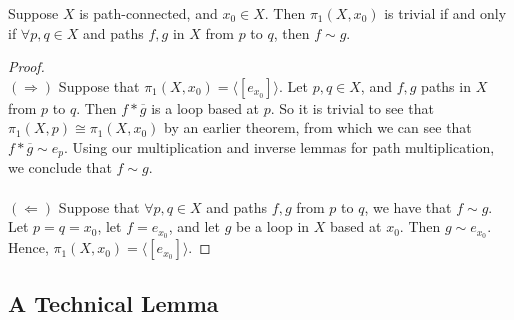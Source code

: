 \begin{lemma}
Suppose $X$ is path-connected, and $x_0 \in X$. Then $\pi_1(X,x_0) $ is trivial if and only if $\forall p,q\in X$ and paths $f,g$  in $X$ from $p$ to $q$, then $f\sim g$. 
\end{lemma}
\begin{proof} \text{}\\
$(\Rightarrow)$ Suppose that $\pi_1 (X,x_0) = \langle [e_{x_0} ] \rangle$. Let $p,q \in X$, and $f,g$ paths in $X$ from $p$ to $q$. Then $f\ast \overline{g}$ is a loop based at $p$. So it is trivial to see that $\pi_1 (X, p) \cong \pi_1 (X,x_0)$ by an earlier theorem, from which we can see that $f\ast \overline{g} \sim e_p$. Using our multiplication and inverse lemmas for path multiplication, we conclude that $f\sim g$. \\\\
$(\Leftarrow)$ Suppose that $\forall p,q \in X$ and paths $f,g$ from $p$ to $q$, we have that $f\sim g$. Let $p=q=x_0$, let $f = e_{x_0}$, and let $g$ be a loop in $X$ based at $x_0$. Then $g\sim e_{x_0}$. Hence, $\pi_1(X,x_0) = \langle [e_{x_0}] \rangle$. 
\end{proof}

\subsection{A Technical Lemma}

